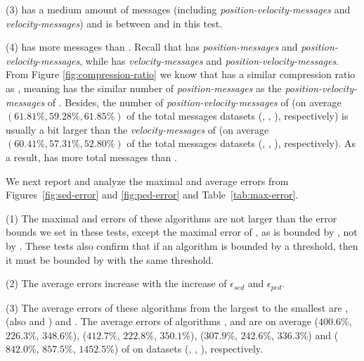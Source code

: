 {{%

\ni (3) \citt has a medium amount of messages (including \emph{position-velocity-messages} and \emph{velocity-messages}) and \bitt is between \citt and \sitt in this test.


\ni (4) \grts has more messages than \citt. Recall that \grts has \emph{position-messages} and \emph{position-velocity-messages}, while \citt has \emph{velocity-messages} and \emph{position-velocity-messages}. From Figure \ref{fig:compression-ratio} we know that \grts has a similar compression ratio as \citt, meaning \grts has the similar number of \emph{position-messages} as the \emph{position-velocity-messages} of \citt. Besides, the  number of \emph{position-velocity-messages} of \grts ({on average $(61.81\%, 59.28\%, 61.85\%)$} of the total messages \wrt datasets (\mopsi, \sercar, \geolife), respectively) is usually a bit larger than the \emph{velocity-messages} of \citt (on average $(60.41\%, 57.31\%, 52.80\%)$ of the total messages \wrt datasets (\mopsi, \sercar, \geolife), respectively). As a result, \grts has more total messages than \citt.





 We next report and analyze the maximal and average errors from  Figures~\ref{fig:sed-error} and \ref{fig:ped-error} and Table~\ref{tab:max-error}.


\ni (1) The maximal \ped and \sed errors of these algorithms are not larger than the error bounds we set in these tests, except the maximal \sed error of \sitt, as \sitt is bounded by \ped, not by \sed. These tests also confirm that if an algorithm is bounded by a \sed threshold, then it must be bounded by \ped with the same threshold.

\ni (2) The average errors increase with the increase of $\epsilon_{sed}$ and $\epsilon_{ped}$.

\ni (3) The average \sed errors of these algorithms from the largest to the smallest are \sitt, \citt (also \grts and \bitt) and \ldrh. The average \sed errors of algorithms \grts, \citt \bitt and \sitt are on average
($400.6\%$, $226.3\%$, $348.6\%$), ($412.7\%$, $222.8\%$, $350.1\%$), ($307.9\%$, $242.6\%$, $336.3\%$) and ($842.0\%$, $857.5\%$, $1452.5\%$)
of \ldrh on datasets (\mopsi, \sercar, \geolife), respectively.

}}
